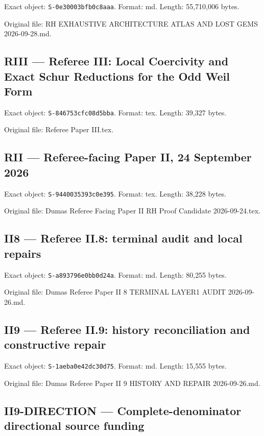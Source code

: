 \documentclass[
  10pt,
  a4paper,
  10pt,
  oneside,
  openany]{book}
\begin{document}
Exact object: \texttt{S-0e30003bfb0c8aaa}. Format: md. Length:
55,710,006 bytes.

Original file: RH EXHAUSTIVE ARCHITECTURE ATLAS AND LOST GEMS
2026-09-28.md.

\subsection{RIII --- Referee III: Local Coercivity and Exact Schur
Reductions for the Odd Weil Form}\label{source-riii}

Exact object: \texttt{S-846753cfc08d5bba}. Format: tex. Length: 39,327
bytes.

Original file: Referee Paper III.tex.

\subsection{RII --- Referee-facing Paper II, 24 September
2026}\label{source-rii}

Exact object: \texttt{S-9440035393c0e395}. Format: tex. Length: 38,228
bytes.

Original file: Dumas Referee Facing Paper II RH Proof Candidate
2026-09-24.tex.

\subsection{II8 --- Referee II.8: terminal audit and local
repairs}\label{source-ii8}

Exact object: \texttt{S-a893796e0bb0d24a}. Format: md. Length: 80,255
bytes.

Original file: Dumas Referee Paper II 8 TERMINAL LAYER1 AUDIT
2026-09-26.md.

\subsection{II9 --- Referee II.9: history reconciliation and
constructive repair}\label{source-ii9}

Exact object: \texttt{S-1aeba0e42dc30d75}. Format: md. Length: 15,555
bytes.

Original file: Dumas Referee Paper II 9 HISTORY AND REPAIR
2026-09-26.md.

\subsection{II9-DIRECTION --- Complete-denominator directional source
funding}\label{source-ii9-direction}
\end{document}
